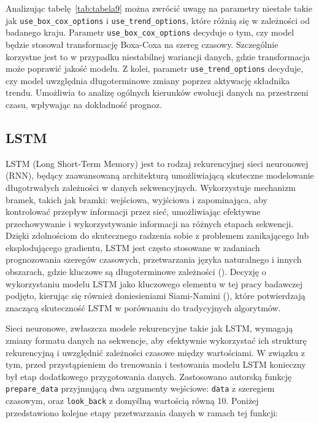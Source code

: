 \documentclass[polish, twoside, 12pt, a4paper]{article}
\theoremstyle{definition}
\theoremstyle{plain}
\theoremstyle{remark}
\newcommand{\code}[1]{\lstinline{#1}}
\begin{document}
Analizując tabelę~\ref{tab:tabela9} można zwrócić uwagę na parametry niestałe takie jak \code{use_box_cox_options} i \code{use_trend_options}, które różnią się w zależności od badanego kraju. Parametr \code{use_box_cox_options} decyduje o tym, czy model będzie stosował transformację Boxa-Coxa na szereg czasowy. Szczególnie korzystne jest to w przypadku niestabilnej wariancji danych, gdzie transformacja może poprawić jakość modelu. Z kolei, parametr \code{use_trend_options} decyduje, czy model uwzględnia długoterminowe zmiany poprzez aktywację składnika trendu. Umożliwia to analizę ogólnych kierunków ewolucji danych na przestrzeni czasu, wpływając na dokładność prognoz.

\subsection{LSTM}

LSTM (Long Short-Term Memory) jest to rodzaj rekurencyjnej sieci neuronowej (RNN), będący zaawansowaną architekturą umożliwiającą skuteczne modelowanie długotrwałych zależności w danych sekwencyjnych. Wykorzystuje mechanizm bramek, takich jak bramki: wejściowa, wyjściowa i zapominająca, aby kontrolować przepływ informacji przez sieć, umożliwiając efektywne przechowywanie i wykorzystywanie informacji na różnych etapach sekwencji. Dzięki zdolnościom do skutecznego radzenia sobie z problemem zanikającego lub eksplodującego gradientu, LSTM jest często stosowane w zadaniach prognozowania szeregów czasowych, przetwarzania języka naturalnego i innych obszarach, gdzie kluczowe są długoterminowe zależności (\cite{geron2020}).  Decyzję o wykorzystaniu modelu LSTM jako kluczowego elementu w tej pracy badawczej podjęto, kierując się również doniesieniami Siami-Namini (\cite{siami-namini2018}), które potwierdzają znaczącą skuteczność LSTM w porównaniu do tradycyjnych algorytmów.

Sieci neuronowe, zwłaszcza modele rekurencyjne takie jak LSTM, wymagają zmiany formatu danych na sekwencje, aby efektywnie wykorzystać ich strukturę rekurencyjną i uwzględnić zależności czasowe między wartościami. W związku z tym, przed przystąpieniem do trenowania i testowania modelu LSTM konieczny był etap dodatkowego przygotowania danych. Zastosowano autorską funkcję \code{prepare_data} przyjmującą dwa argumenty wejściowe: \code{data} z szeregiem czasowym, oraz \code{look_back} z domyślną wartością równą 10. Poniżej przedstawiono kolejne etapy przetwarzania danych w ramach tej funkcji:
\end{document}
